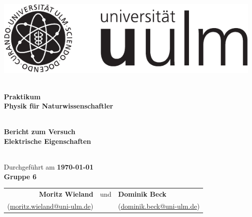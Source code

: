 \documentclass[11pt]{betterallrounder}
\begin{document}
\begin{titlepage}

    \begin{center}

        \begin{minipage}{\textwidth}
            \begin{center}
                \includegraphics{bilder/Logo_uulm_Vorlage_100mm_schwarz.pdf}
            \end{center}
        \end{minipage}
    
        \textsc{\Large }\\[1.5cm]
        
        {\huge \bfseries Praktikum\\[0.5cm]}
        {\huge \bfseries Physik für Naturwissenschaftler}

        \textsc{\Large }\\[1.5cm]

        {\large \bfseries Bericht zum Versuch}\\[0.5cm]
        
        {\huge \bfseries Elektrische Eigenschaften\\[0.4cm]}

        \textsc{\Large }\\[1.5cm]

        {\large Durchgeführt am \bfseries{\today}}\\[1cm]
        
        {\huge \bfseries Gruppe 6\\[0.4cm]}

        \Large
        \begin{tabular}{rcl}
            \bfseries{Moritz Wieland} & und & \bfseries{Dominik Beck}\\
            (\href{mailto:moritz.wieland@uni-ulm.de}{moritz.wieland@uni-ulm.de}) & & (\href{mailto:dominik.beck@uni-ulm.de}{dominik.beck@uni-ulm.de})
        \end{tabular}

        \textsc{\huge }\\[1cm]


\end{center}
\end{titlepage}
\end{document}
